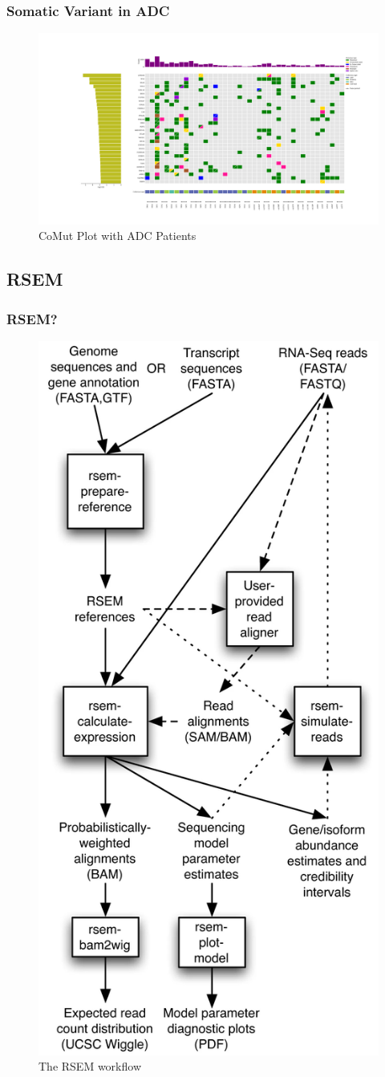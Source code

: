 \documentclass{beamer}
\begin{document}
    \begin{frame}
        \frametitle{Somatic Variant in ADC}

        \begin{figure}
            \includegraphics[width=\linewidth]{figures/Mutect2/Mutect2-ADC.pdf}
            \caption{CoMut Plot with ADC Patients}
        \end{figure}
    \end{frame}

    \subsection{RSEM}
    \begin{frame}
        \frametitle{RSEM?}

        \begin{figure}
            \includegraphics[width=0.2 \linewidth]{figures/Workflow/RSEM.jpg}
            \caption{The RSEM workflow \protect\cite{RSEM1}}
        \end{figure}
    \end{frame}
\end{document}
